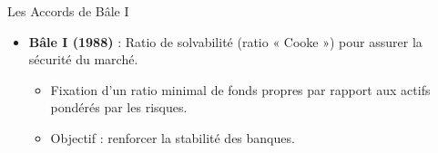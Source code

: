 \begin{frame}{Les Accords de Bâle I}
    \begin{itemize}
        \item \textbf{Bâle I (1988)} : Ratio de solvabilité (ratio « Cooke ») pour assurer la sécurité du marché.
            \begin{itemize}
                \item Fixation d'un ratio minimal de fonds propres par rapport aux actifs pondérés par les risques.
                \item Objectif : renforcer la stabilité des banques.
            \end{itemize}
    \end{itemize}
\end{frame}
